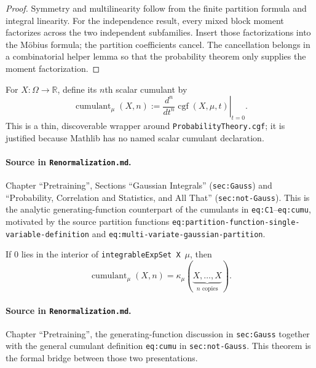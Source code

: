 \begin{proof}
Symmetry and multilinearity follow from the finite partition formula and integral linearity.
For the independence result, every mixed block moment factorizes across the two independent
subfamilies.  Insert those factorizations into the M\"obius formula; the partition coefficients
cancel.  The cancellation belongs in a combinatorial helper lemma so that the probability theorem
only supplies the moment factorization.
\end{proof}

\begin{definition}
\label{def:renorm:scalarCumulant}
For $X:\Omega\to\mathbb R$, define its $n$th scalar cumulant by
\[
  \operatorname{cumulant}_\mu(X,n)
  :=\left.\frac{d^n}{dt^n}\operatorname{cgf}(X,\mu,t)\right|_{t=0}.
\]
This is a thin, discoverable wrapper around \texttt{ProbabilityTheory.cgf}; it is justified because
Mathlib has no named scalar cumulant declaration.

\paragraph{Source in \texttt{Renormalization.md}.}
Chapter ``Pretraining'', Sections ``Gaussian Integrals'' (\texttt{sec:Gauss}) and ``Probability,
Correlation and Statistics, and All That'' (\texttt{sec:not-Gauss}).  This is the analytic
generating-function counterpart of the cumulants in \texttt{eq:C1}--\texttt{eq:cumu}, motivated by
the source partition functions \texttt{eq:partition-function-single-variable-definition} and
\texttt{eq:multi-variate-gaussian-partition}.
\end{definition}

\begin{theorem}
\label{thm:renorm:cumulant_eq_jointCumulant}
If $0$ lies in the interior of \texttt{integrableExpSet X}~$\mu$, then
\[
  \operatorname{cumulant}_\mu(X,n)
  =\kappa_\mu(\underbrace{X,\ldots,X}_{n\text{ copies}}).
\]

\paragraph{Source in \texttt{Renormalization.md}.}
Chapter ``Pretraining'', the generating-function discussion in \texttt{sec:Gauss} together with the
general cumulant definition \texttt{eq:cumu} in \texttt{sec:not-Gauss}.  This theorem is the formal
bridge between those two presentations.
\end{theorem}

